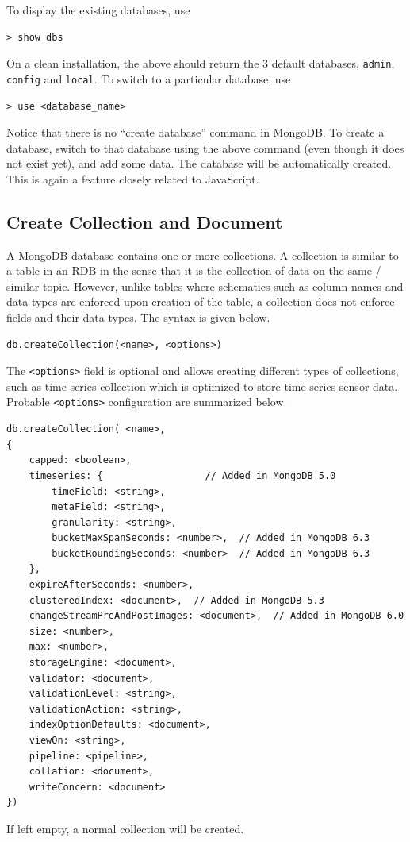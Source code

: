 To display the existing databases, use
\begin{lstlisting}
> show dbs
\end{lstlisting}
On a clean installation, the above should return the 3 default databases, \verb|admin|, \verb|config| and \verb|local|. To switch to a particular database, use
\begin{lstlisting}
> use <database_name>
\end{lstlisting}
Notice that there is no ``create database'' command in MongoDB. To create a database, switch to that database using the above command (even though it does not exist yet), and add some data. The database will be automatically created. This is again a feature closely related to JavaScript.

\subsection{Create Collection and Document}

A MongoDB database contains one or more collections. A collection is similar to a table in an RDB in the sense that it is the collection of data on the same / similar topic. However, unlike tables where schematics such as column names and data types are enforced upon creation of the table, a collection does not enforce fields and their data types. The syntax is given below.
\begin{lstlisting}
db.createCollection(<name>, <options>)
\end{lstlisting}

The \verb|<options>| field is optional and allows creating different types of collections, such as time-series collection which is optimized to store time-series sensor data. Probable \verb|<options>| configuration are summarized below.
\begin{lstlisting}
db.createCollection( <name>,
{
	capped: <boolean>,
	timeseries: {                  // Added in MongoDB 5.0
		timeField: <string>,
		metaField: <string>,
		granularity: <string>,
		bucketMaxSpanSeconds: <number>,  // Added in MongoDB 6.3
		bucketRoundingSeconds: <number>  // Added in MongoDB 6.3
	},
	expireAfterSeconds: <number>,
	clusteredIndex: <document>,  // Added in MongoDB 5.3
	changeStreamPreAndPostImages: <document>,  // Added in MongoDB 6.0
	size: <number>,
	max: <number>,
	storageEngine: <document>,
	validator: <document>,
	validationLevel: <string>,
	validationAction: <string>,
	indexOptionDefaults: <document>,
	viewOn: <string>,
	pipeline: <pipeline>,
	collation: <document>,
	writeConcern: <document>
})
\end{lstlisting}
If left empty, a normal collection will be created.

